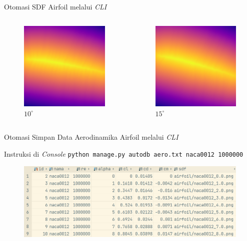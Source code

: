\begin{frame}{Otomasi SDF Airfoil melalui \textit{CLI}}
\begin{columns}[t]
    \begin{column}{.25\linewidth}
      \begin{figure}[h]
        \centering
        \includegraphics[width=0.5\linewidth]{statics/naca0012_10.0}
        \caption{$10^\circ$}
      \end{figure}
    \end{column}

    \begin{column}{.25\linewidth}
      \begin{figure}[h]
        \centering
        \includegraphics[width=0.5\linewidth]{statics/naca0012_15.0}
        \caption{$15^\circ$}
      \end{figure}
    \end{column}
  \end{columns}
\end{frame}

\begin{frame}{Otomasi Simpan Data Aerodinamika Airfoil melalui \textit{CLI}}
  \begin{block}{Instruksi di \textit{Console}}
    \texttt{python manage.py autodb aero.txt naca0012 1000000}
  \end{block}

  \begin{figure}[h]
    \centering
    \includegraphics[width=0.7\linewidth]{statics/autoinsert}
  \end{figure}

\end{frame}
